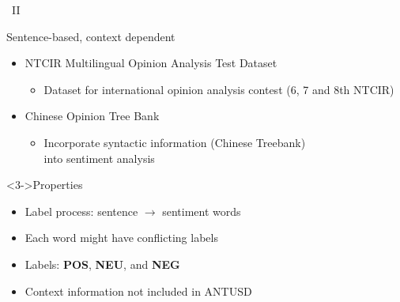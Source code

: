 \documentclass[compress]{beamer}
\begin{document}
        \begin{frame}{\subsecname\ II}
            \begin{block}{Sentence-based, context dependent}
                \begin{itemize}
                    \item<1-> NTCIR Multilingual Opinion Analysis Test Dataset
                        \begin{itemize}
                            \item<2->  Dataset for international opinion analysis contest (6, 7 and 8th NTCIR)
                        \end{itemize}

                    \item<1-> Chinese Opinion Tree Bank
                        \begin{itemize}
                            \item<2-> Incorporate syntactic information (Chinese Treebank)\\ into sentiment analysis
                        \end{itemize}
                \end{itemize}
            \end{block}
            \begin{block}<3->{Properties}
                \begin{itemize}
                    \item Label process:  sentence $\rightarrow$ sentiment words
                    \item Each word might have conflicting labels
                    \item Labels: \textbf{POS}, \textbf{NEU}, and \textbf{NEG}
                    \item Context information not included in ANTUSD
                \end{itemize}
            \end{block}
        \end{frame}
\end{document}
